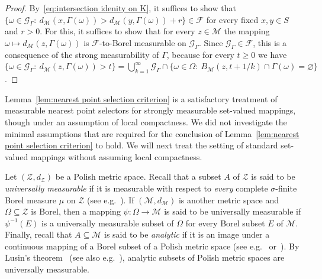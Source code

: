 \documentclass[11pt,reqno]{amsart}
\renewcommand{\ge}{\geqslant}
\theoremstyle{remark}
\newcommand{\MM}{\mathcal{M}}
\renewcommand{\subset}{\subseteq}
\renewcommand{\emptyset}{\varnothing}
\renewcommand{\1}{\mathbf 1}
\newcommand{\ZZ}{\mathcal{Z}}
\newcommand{\cF}{\mathscr{F}}
\newcommand{\cG}{\mathscr{G}}
\begin{document}
\begin{proof}
  By~\eqref{eq:intersection idenity on K}, it suffices to show that $\{\omega\in \cG_\Gamma:\ d_\MM(x,\Gamma(\omega))>d_\MM(y,\Gamma(\omega))+r\}\in \mathscr{F}$ for every fixed $x,y\in S$ and $r>0$. For this, it suffices to show that for every $z\in \MM$ the mapping $\omega\mapsto d_\MM(z,\Gamma(\omega))$ is $\cF$-to-Borel measurable on $\cG_\Gamma$. Since $\cG_\Gamma\in \mathscr{F}$, this is a consequence of  the strong measurability of $\Gamma$, because for every $t\ge 0$ we have $\{\omega\in \cG_\Gamma:\ d_\MM(z,\Gamma(\omega))>t\}=\bigcup_{k=1}^\infty \cG_\Gamma\cap \{\omega\in \Omega:\ B_\MM(z,t+1/k)\cap \Gamma(\omega)=\emptyset\}$.
\end{proof}

Lemma~\ref{lem:nearest point selection criterion} is a satisfactory treatment of measurable nearest point selectors for strongly measurable set-valued mappings, though under an assumption of local compactness. We did not investigate the minimal assumptions that are required for the conclusion of Lemma~\ref{lem:nearest point selection criterion}  to hold. We will next treat the setting of standard set-valued mappings without assuming local compactness.

Let $(\ZZ,d_\ZZ)$ be a Polish metric space. Recall that a subset $A$ of $\ZZ$ is said to be {\em universally measurable} if it is measurable with respect to {\em every} complete $\sigma$-finite Borel measure $\mu$ on $\ZZ$ (see e.g.~\cite[page~155]{Kec95}). If $(\MM,d_\MM)$ is another metric space and $\Omega\subset \ZZ$ is Borel, then  a mapping $\psi:\Omega\to \MM$ is said to be universally measurable if $\psi^{-1}(E)$ is a universally measurable subset of $\Omega$ for every Borel subset $E$ of $\MM$. Finally, recall that $A\subset \MM$ is said to be {\em analytic}  if it is an image under a continuous mapping of a Borel subset of a Polish metric space (see e.g.~\cite[Chapter~14]{Kec95} or~\cite[Chapter~11]{Jec03}). By  Lusin's theorem~\cite{Luz17,Lus72} (see also e.g.~\cite[Theorem~21.10]{Kec95}), analytic subsets of Polish metric spaces are universally measurable.
\end{document}
